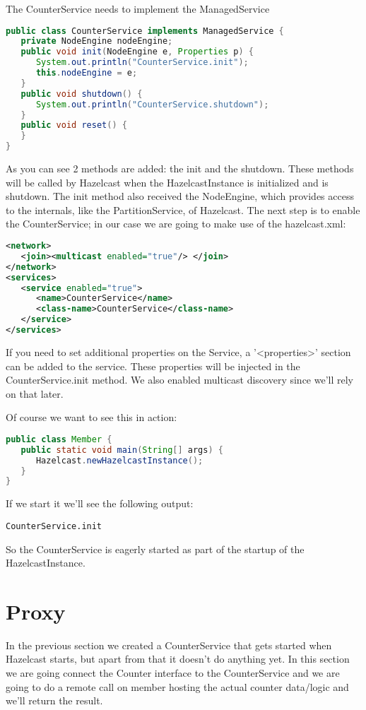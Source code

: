 The CounterService needs to implement the ManagedService
\begin{lstlisting}[language=java]
public class CounterService implements ManagedService {
   private NodeEngine nodeEngine;
   public void init(NodeEngine e, Properties p) {
      System.out.println("CounterService.init");
      this.nodeEngine = e;
   }
   public void shutdown() {
      System.out.println("CounterService.shutdown");
   }
   public void reset() {
   }
}
\end{lstlisting}
As you can see 2 methods are added: the init and the shutdown. These methods will be called by Hazelcast when the HazelcastInstance is initialized and is shutdown. The init method also received the NodeEngine, which provides access to the internals, like the PartitionService, of Hazelcast. The next step is to enable the CounterService; in our case we are going to make use of the hazelcast.xml:
\begin{lstlisting}[language=xml]
<network>
   <join><multicast enabled="true"/> </join>
</network>
<services>
   <service enabled="true">
      <name>CounterService</name>
      <class-name>CounterService</class-name>
   </service>
</services>
\end{lstlisting}
If you need to set additional properties on the Service, a '<properties>' section can be added to the service. These properties will be injected in the CounterService.init method. We also enabled multicast discovery since we'll rely on that later.

Of course we want to see this in action:
\begin{lstlisting}[language=java]
public class Member {
   public static void main(String[] args) {
      Hazelcast.newHazelcastInstance();
   }
}
\end{lstlisting}
If we start it we'll see the following output:
\begin{lstlisting}
CounterService.init
\end{lstlisting}
So the CounterService is eagerly started as part of the startup of the HazelcastInstance.

\section{Proxy}
In the previous section we created a CounterService that gets started when Hazelcast starts, but apart from that it doesn't do anything yet. In this section we are going connect the Counter interface to the CounterService and we are going to do a remote call on member hosting the actual counter data/logic and we'll return the result.

